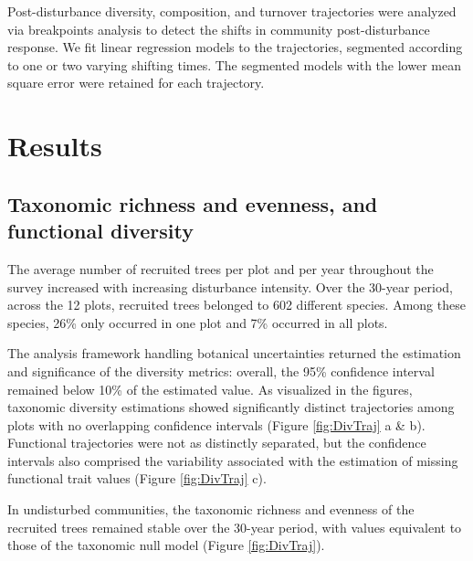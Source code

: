 \documentclass[fleqn,10pt]{ArtEcoFoG} %
\begin{document}
Post-disturbance diversity, composition, and turnover trajectories were analyzed via breakpoints analysis to detect the shifts in community post-disturbance response. We fit linear regression models to the trajectories, segmented according to one or two varying shifting times. The segmented models with the lower mean square error were retained for each trajectory.

\hypertarget{results}{%
\section{Results}\label{results}}

\hypertarget{taxonomic-richness-and-evenness-and-functional-diversity}{%
\subsection{Taxonomic richness and evenness, and functional diversity}\label{taxonomic-richness-and-evenness-and-functional-diversity}}

The average number of recruited trees per plot and per year throughout the survey increased with increasing disturbance intensity. Over the 30-year period, across the 12 plots, recruited trees belonged to 602 different species. Among these species, 26\% only occurred in one plot and 7\% occurred in all plots.

The analysis framework handling botanical uncertainties returned the estimation and significance of the diversity metrics: overall, the 95\% confidence interval remained below 10\% of the estimated value. As visualized in the figures, taxonomic diversity estimations showed significantly distinct trajectories among plots with no overlapping confidence intervals (Figure \ref{fig:DivTraj} a \& b). Functional trajectories were not as distinctly separated, but the confidence intervals also comprised the variability associated with the estimation of missing functional trait values (Figure \ref{fig:DivTraj} c).

In undisturbed communities, the taxonomic richness and evenness of the recruited trees remained stable over the 30-year period, with values equivalent to those of the taxonomic null model (Figure \ref{fig:DivTraj}).
\end{document}
